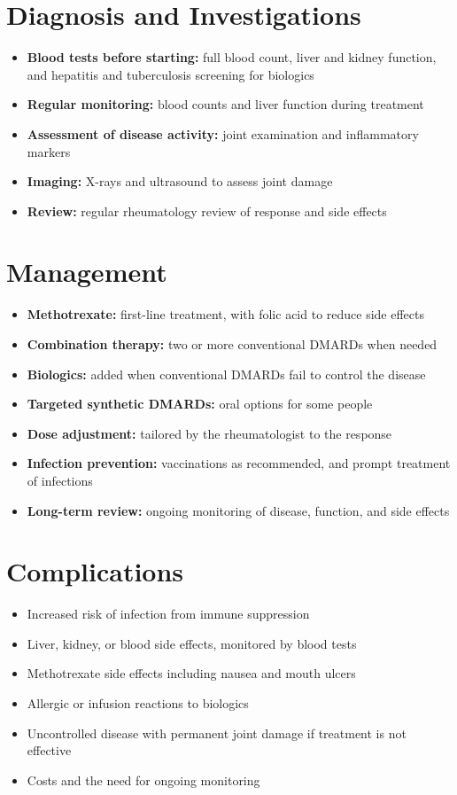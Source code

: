 \section*{Diagnosis and Investigations}
\begin{itemize}
    \item \textbf{Blood tests before starting:} full blood count, liver and kidney function, and hepatitis and tuberculosis screening for biologics
    \item \textbf{Regular monitoring:} blood counts and liver function during treatment
    \item \textbf{Assessment of disease activity:} joint examination and inflammatory markers
    \item \textbf{Imaging:} X-rays and ultrasound to assess joint damage
    \item \textbf{Review:} regular rheumatology review of response and side effects
\end{itemize}

\section*{Management}
\begin{itemize}
    \item \textbf{Methotrexate:} first-line treatment, with folic acid to reduce side effects
    \item \textbf{Combination therapy:} two or more conventional DMARDs when needed
    \item \textbf{Biologics:} added when conventional DMARDs fail to control the disease
    \item \textbf{Targeted synthetic DMARDs:} oral options for some people
    \item \textbf{Dose adjustment:} tailored by the rheumatologist to the response
    \item \textbf{Infection prevention:} vaccinations as recommended, and prompt treatment of infections
    \item \textbf{Long-term review:} ongoing monitoring of disease, function, and side effects
\end{itemize}

\section*{Complications}
\begin{itemize}
    \item Increased risk of infection from immune suppression
    \item Liver, kidney, or blood side effects, monitored by blood tests
    \item Methotrexate side effects including nausea and mouth ulcers
    \item Allergic or infusion reactions to biologics
    \item Uncontrolled disease with permanent joint damage if treatment is not effective
    \item Costs and the need for ongoing monitoring
\end{itemize}

